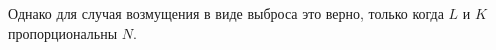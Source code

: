 \documentclass[specialist,
               substylefile = spbu.rtx,
               subf,href,colorlinks=true, 12pt]{disser}
\begin{document}
Однако для случая возмущения в виде выброса это верно, только когда $L$ и $K$ пропорциональны $N$.

%
%
%
%
%
%
%
\end{document}
